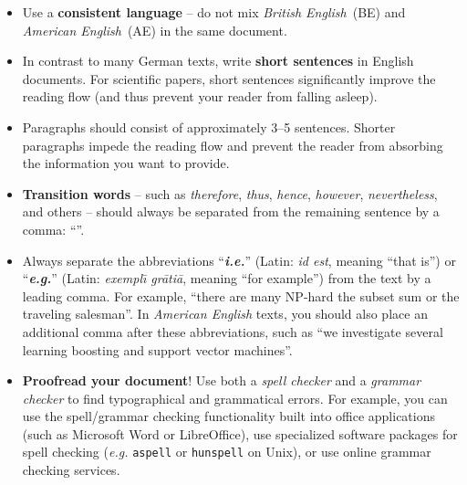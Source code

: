 \documentclass[11pt,a4paper]{article}
\begin{document}
\begin{itemize}

\item Use a \textbf{consistent language} -- do not mix \emph{British English}~(BE) and \emph{American English}~(AE) in the same document. 
 
\item In contrast to many German texts, write \textbf{short sentences} in 
English documents. For scientific papers, short sentences significantly improve 
the reading flow (and thus prevent your reader from falling asleep).
 
\item Paragraphs should consist of approximately 3--5 sentences. Shorter paragraphs impede the reading flow and prevent the reader from absorbing the information you want to provide.
 
\item \textbf{Transition words} -- such as \emph{therefore}, \emph{thus}, \emph{hence}, \emph{however}, \emph{nevertheless}, and others -- should always be separated from the remaining sentence by a comma: ``''.
 
\item Always separate the abbreviations ``\textbf{\emph{i.e.}}'' (Latin: \emph{id est}, meaning ``that is'') or ``\textbf{\emph{e.g.}}'' (Latin: \emph{exempl\={\i} gr\={a}ti\={a}}, meaning ``for example'') from the text by a leading comma. For example, ``there are many NP-hard  the subset sum or the traveling salesman''. In \emph{American English} texts, you should also place an additional comma after these abbreviations, such as ``we investigate several learning  boosting and support vector machines''.
 


 \item \textbf{Proofread your document}! Use both a \emph{spell checker} and a \emph{grammar checker} to find typographical and grammatical errors.
 For example, you can use the spell/grammar checking functionality built into office applications (such as Microsoft Word or LibreOffice), use specialized software packages for spell checking (\emph{e.g.} \texttt{aspell} or \texttt{hunspell} on Unix), or use online grammar checking services.
% 
\end{itemize}
\end{document}
